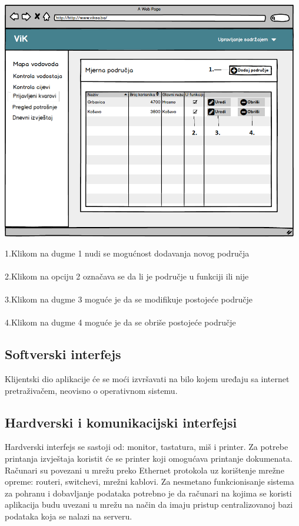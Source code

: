 \documentclass[]{report}
\begin{document}
\begin{center}
\includegraphics[width=13cm]{UI5.png}
\end{center}

1.Klikom na dugme 1 nudi se mogućnost dodavanja novog područja
\\
\\
2.Klikom na opciju 2 označava se da li je područje u funkciji ili nije
\\
\\
3.Klikom na dugme 3 moguće je da se modifikuje postojeće područje
\\
\\
4.Klikom na dugme 4 moguće je da se obriše postojeće područje
\subsection{Softverski interfejs}
Klijentski dio aplikacije će se moći izvršavati na bilo kojem uređaju sa internet pretraživačem, neovisno o operativnom sistemu. 
  
\subsection{Hardverski i komunikacijski interfejsi}
Hardverski interfejs se sastoji od: monitor, tastatura, miš i printer. Za potrebe printanja izvještaja koristit će se printer koji omogućava printanje dokumenata. Računari su povezani u mrežu preko Ethernet protokola uz korištenje mrežne opreme: routeri, switchevi, mrežni kablovi. Za nesmetano funkcionisanje sistema za pohranu i dobavljanje podataka potrebno je da računari na kojima se koristi aplikacija budu uvezani u mrežu na način da imaju pristup centralizovanoj bazi podataka koja se nalazi na serveru. 
\end{document}

